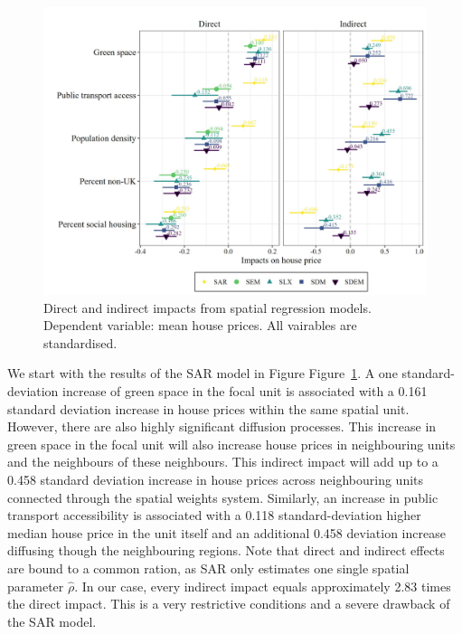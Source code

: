 \documentclass[
  letterpaper,
]{scrbook}
\begin{document}
\begin{figure}

{\centering \includegraphics{fig/Coefplot.jpeg}

}

\caption{\label{fig-coefs}Direct and indirect impacts from spatial
regression models. Dependent variable: mean house prices. All vairables
are standardised.}

\end{figure}

We start with the results of the SAR model in Figure
Figure~\ref{fig-coefs}. A one standard-deviation increase of green space
in the focal unit is associated with a 0.161 standard deviation increase
in house prices within the same spatial unit. However, there are also
highly significant diffusion processes. This increase in green space in
the focal unit will also increase house prices in neighbouring units and
the neighbours of these neighbours. This indirect impact will add up to
a 0.458 standard deviation increase in house prices across neighbouring
units connected through the spatial weights system. Similarly, an
increase in public transport accessibility is associated with a 0.118
standard-deviation higher median house price in the unit itself and an
additional 0.458 deviation increase diffusing though the neighbouring
regions. Note that direct and indirect effects are bound to a common
ration, as SAR only estimates one single spatial parameter \(\hat\rho\).
In our case, every indirect impact equals approximately 2.83 times the
direct impact. This is a very restrictive conditions and a severe
drawback of the SAR model.
\end{document}
